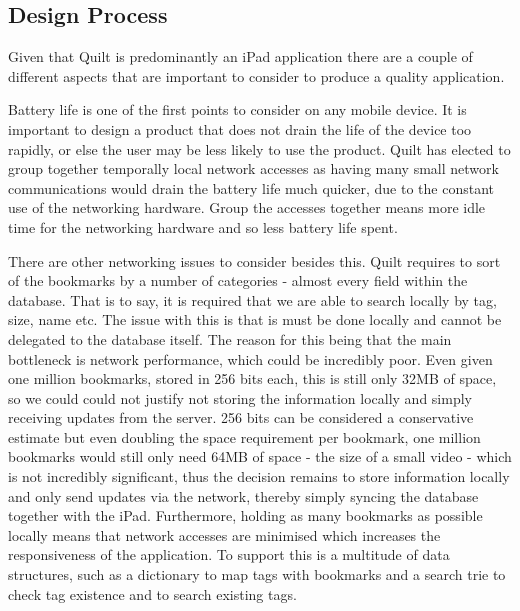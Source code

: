 \documentclass[a4wide, 10pt]{article}
\begin{document}
\subsection{Design Process}

Given that Quilt is predominantly an iPad application there are a couple of different aspects that are important to consider to produce a quality application.

Battery life is one of the first points to consider on any mobile device. It is important to design a product that does not drain the life of the device too rapidly, or else the user may be less likely to use the product. Quilt has elected to group together temporally local network accesses as having many small network communications would drain the battery life much quicker, due to the constant use of the networking hardware. Group the accesses together means more idle time for the networking hardware and so less battery life spent. 

There are other networking issues to consider besides this. Quilt requires to sort of the bookmarks by a number of categories - almost every field within the database. That is to say, it is required that we are able to search locally by tag, size, name etc. The issue with this is that is must be done locally and cannot be delegated to the database itself. The reason for this being that the main bottleneck is network performance, which could be incredibly poor. Even given one million bookmarks, stored in 256 bits each, this is still only 32MB of space, so we could could not justify not storing the information locally and simply receiving updates from the server. 256 bits can be considered a conservative estimate but even doubling the space requirement per bookmark, one million bookmarks would still only need 64MB of space - the size of a small video - which is not incredibly significant, thus the decision remains to store information locally and only send updates via the network, thereby simply syncing the database together with the iPad. Furthermore, holding as many bookmarks as possible locally means that  network accesses are minimised which increases the responsiveness of the application. To support this is a multitude of data structures, such as a dictionary to map tags with bookmarks and a search trie to check tag existence and to search existing tags.
\end{document}
